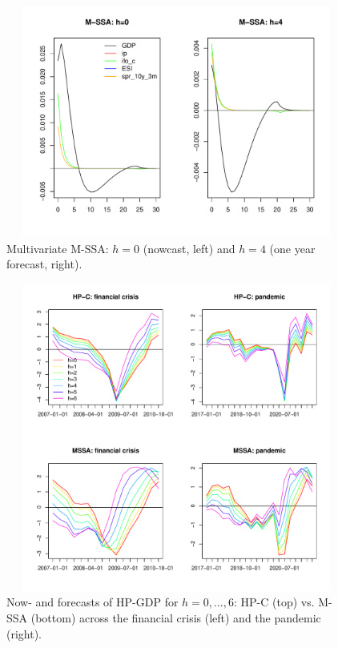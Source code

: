 \documentclass[a4paper]{article}
\begin{document}
\begin{figure}[H]\begin{center}\includegraphics[height=3in, width=5.5in]{./Figures/bk_h.pdf}\caption{Multivariate M-SSA: $h=0$ (nowcast, left) and $h=4$ (one year forecast, right).\label{bk_h}}\end{center}\end{figure}\begin{figure}[H]\begin{center}\includegraphics[height=4in, width=5.5in]{./Figures/multivar_vs_univar.pdf}\caption{Now- and forecasts of HP-GDP for $h=0,...,6$: HP-C (top) vs. M-SSA (bottom) across the financial crisis (left) and the pandemic (right).\label{multivar_vs_univar}}\end{center}\end{figure}
\end{document}
